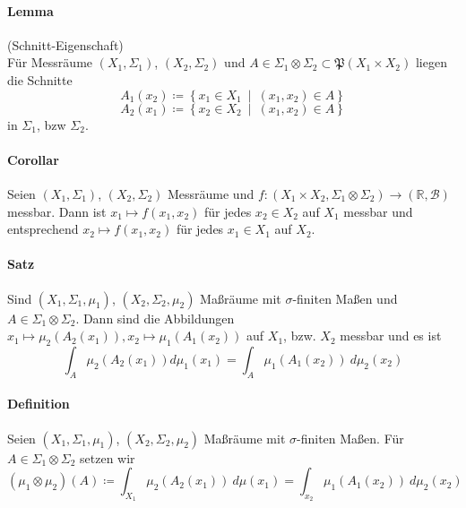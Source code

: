 \documentclass[12pt,a4paper,fleqn]{article}
\def\set#1{{\left\{ #1 \right\}}}
\def\Mid{\ \middle|\ }
\begin{document}
\paragraph{Lemma} (Schnitt-Eigenschaft)\\
Für Messräume $(X_1, \Sigma_1)$, $(X_2, \Sigma_2)$ und $A \in \Sigma_1 \otimes \Sigma_2 \subset \mathfrak{P}(X_1 \times X_2)$ liegen die Schnitte
\begin{displaymath}
A_1(x_2) \coloneqq \set{x_1 \in X_1 \Mid (x_1, x_2) \in A} 
\end{displaymath}
\begin{displaymath}
A_2(x_1) \coloneqq \set{x_2 \in X_2 \Mid (x_1, x_2) \in A} 
\end{displaymath}
in $\Sigma_1$, bzw $\Sigma_2$.

\paragraph{Corollar} Seien $(X_1, \Sigma_1)$, $(X_2, \Sigma_2)$ Messräume und ${f\colon (X_1 \times X_2, \Sigma_1 \otimes \Sigma_2) \rightarrow (\mathbb{R}, \mathcal{B})}$ messbar. Dann ist $x_1 \mapsto f(x_1, x_2)$ für jedes $x_2 \in X_2$ auf $X_1$ messbar und entsprechend $x_2 \mapsto f(x_1, x_2)$ für jedes $x_1 \in X_1$ auf $X_2$.

\paragraph{Satz} Sind $(X_1, \Sigma_1, \mu_1)$, $(X_2, \Sigma_2, \mu_2)$ Maßräume mit $\sigma$-finiten Maßen und ${A \in \Sigma_1 \otimes \Sigma_2}$. Dann sind die Abbildungen $x_1 \mapsto \mu_2(A_2(x_1)), x_2 \mapsto \mu_1(A_1(x_2))$ auf $X_1$, bzw. $X_2$ messbar und es ist
\begin{displaymath}
\int_A \mu_2(A_2(x_1)) d\mu_1(x_1) = \int_A \mu_1(A_1(x_2))\ d\mu_2(x_2)
\end{displaymath}

\paragraph{Definition} Seien $(X_1, \Sigma_1, \mu_1)$, $(X_2, \Sigma_2, \mu_2)$ Maßräume mit $\sigma$-finiten Maßen. Für $A \in \Sigma_1 \otimes \Sigma_2$ setzen wir 
\begin{displaymath}
(\mu_1 \otimes \mu_2)(A) \coloneqq \int_{X_1} \mu_2(A_2(x_1))\ d\mu(x_1) = \int_{x_2} \mu_1(A_1(x_2))\ d\mu_2(x_2)
\end{displaymath}
\end{document}

